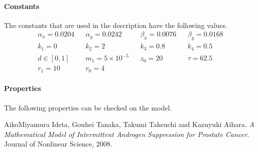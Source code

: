 \documentclass{article}
\begin{document}
\paragraph{Constants} The constants that are used in the description have the
following values. 
\begin{align*}
\alpha_x = 0.0204 && \alpha_y = 0.0242 && \beta_x = 0.0076 && \beta_y = 0.0168
\\
k_1 = 0 && k_2 = 2 && k_3 = 0.8 && k_4 = 0.5 \\
d\in [0,1] && m_1 = 5\times 10^{-5} && z_0 = 20 && \tau = 62.5 \\
r_1 = 10 && r_0 = 4
\end{align*}
\paragraph{Properties}
The following properties can be checked on the model. 


\begin{thebibliography}{1}
 AikoMiyamura Ideta, Gouhei Tanaka, Takumi Takeuchi and
 Kazuyuki Aihara. {\em A Mathematical Model of Intermittent Androgen Suppression
for Prostate Cancer.} Journal of Nonlinear Science, 2008.


  \end{thebibliography}
\end{document}

